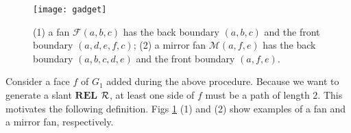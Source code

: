 \documentclass[11pt]{article}
\newcommand{\R}{{\cal R}}
\newcommand{\FF}{\mathcal{F}}
\newcommand{\MM}{\mathcal{M}}
\newcommand{\REL}{\mathbf{REL}}
\begin{document}
\begin{figure}[t]
\begin{center}
\texttt{[image: gadget]}
\centering
\caption{(1)  a fan $\FF(a, b, c)$ has the back boundary $(a, b, c)$ and the front boundary $(a, d, e, f, c)$;
(2)  a mirror fan $\MM(a, f, e)$ has the back boundary $(a, b, c, d, e)$ and the front boundary $(a, f, e)$.}
\label{fig:gadget}
\end{center}
\end{figure}

Consider a face $f$ of $G_1$ added during the above procedure.
Because we want to generate a slant $\REL$ $\R$, at least one side of
$f$ must be a path of length 2. This motivates the following definition.
Figs \ref{fig:gadget} (1) and (2)
show examples of a fan and a mirror fan, respectively.
\end{document}
